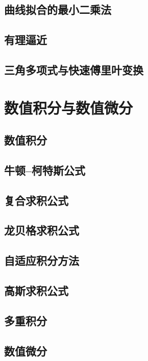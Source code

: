 \section{曲线拟合的最小二乘法}
\section{有理逼近}
\section{三角多项式与快速傅里叶变换}

\chapter{数值积分与数值微分}
\section{数值积分}
\section{牛顿--柯特斯公式}
\section{复合求积公式}
\section{龙贝格求积公式}
\section{自适应积分方法}
\section{高斯求积公式}
\section{多重积分}
\section{数值微分}
